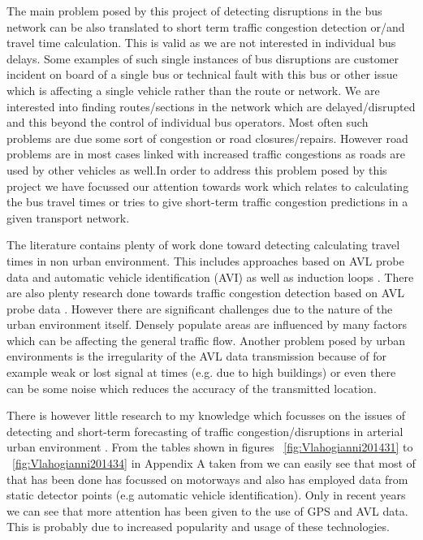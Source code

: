 The main problem posed by this project of detecting disruptions in the bus network can be also translated to short term traffic congestion detection or/and travel time calculation. This is valid as we are not interested in individual bus delays. Some examples of such single instances of bus disruptions are customer incident on board of a single bus or technical fault with this bus or other issue which is affecting a single vehicle rather than the route or network. We are interested into finding routes/sections in the network which are delayed/disrupted and this beyond the control of individual bus operators. Most often such problems are due some sort of congestion or road closures/repairs. However road problems are in most cases linked with increased traffic congestions as roads are used by other vehicles as well.In order to address this problem posed by this project we have focussed our attention towards work which relates to calculating the bus travel times or tries to give short-term traffic congestion predictions in a given transport network.

The literature contains plenty of work done toward detecting calculating travel times in non urban environment. This includes approaches based on AVL probe data and automatic vehicle identification (AVI) as well as induction loops \cite{Vlahogianni20143}. There are also plenty research done towards traffic congestion detection based on AVL probe data \cite{Vlahogianni20143}. However there are significant challenges due to the nature of the urban environment itself. Densely populate areas are influenced by many factors which can be affecting the general traffic flow. Another problem posed by urban environments is the irregularity of the AVL data transmission because of for example weak or lost signal at times (e.g. due to high buildings) or even there can be some noise which reduces the accuracy of the transmitted location. 

There is however little research to my knowledge which focusses on the issues of detecting and short-term forecasting of traffic congestion/disruptions in arterial urban environment  \cite{Vlahogianni20143} \cite{5625144}. From the tables shown in figures ~\ref{fig:Vlahogianni201431} to ~\ref{fig:Vlahogianni201434} in Appendix A taken from \cite{Vlahogianni20143} we can easily see that most of that has been done has focussed on motorways and also has employed data from static detector points (e.g automatic vehicle identification). Only in recent years we can see that more attention has been given to the use of GPS and AVL data. This is probably due to increased popularity and usage of these technologies.

